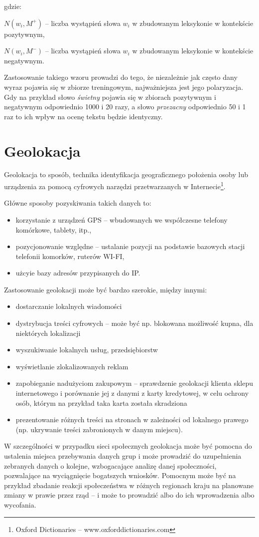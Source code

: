 gdzie:

$N(w_i, M^+)$ -- liczba wystąpień słowa $w_i$ w zbudowanym leksykonie w 
kontekście pozytywnym,

$N(w_i, M^-)$ -- liczba wystąpień słowa $w_i$ w zbudowanym leksykonie w 
kontekście negatywnym.

\bigskip
Zastosowanie takiego wzoru prowadzi do tego, że niezależnie jak często
dany wyraz pojawia się w zbiorze treningowym, najważniejsza jest jego polaryzacja.
Gdy na przykład słowo \textit{świetny} pojawia się w zbiorach pozytywnym
i negatywnym odpowiednio 1000 i 20 razy, a słowo \textit{przezacny} odpowiednio
50 i 1 raz to ich wpływ na ocenę tekstu będzie identyczny.




\clearpage\section{Geolokacja}
Geolokacja to sposób, technika identyfikacja geograficznego położenia osoby
lub urządzenia za pomocą cyfrowych narzędzi przetwarzanych w 
Internecie\footnote{Oxford Dictionaries -- www.oxforddictionaries.com}.

Główne sposoby pozyskiwania takich danych to:
\begin{itemize}
  \item korzystanie z urządzeń GPS -- wbudowanych we współczesne telefony
komórkowe, tablety, itp.,
  \item pozycjonowanie względne -- ustalanie pozycji na podstawie bazowych stacji
telefonii komorków, ruterów WI-FI,
\item użcyie bazy adresów przypisanych do IP.
\end{itemize} 
Zastosowanie geolokacji może być bardzo szerokie, między innymi:
\begin{itemize}
  \item dostarczanie lokalnych wiadomości
  \item dystrybucja treści cyfrowych -- może być np. blokowana możliwość kupna, 
  dla niektórych lokalizacji
  \item wyszukiwanie lokalnych usług, przedsiębiorstw
  \item wyświetlanie zlokalizowanych reklam
  \item zapobieganie nadużyciom zakupowym -- sprawdzenie geolokacji
  klienta sklepu internetowego i porównanie jej z danymi z karty kredytowej,
  w celu ochrony osób, którym na przykład taka karta została skradziona
  \item prezentowanie różnych treści na stronach w zależności od lokalnego
  prawego (np. ukrywanie treści zabronionych w danym miejscu).
\end{itemize}
W szczególności w przypadku sieci społecznych geolokacja może być pomocna do
ustalenia miejsca przebywania danych grup i może prowadzić
do uzupełnienia zebranych danych o kolejne, wzbogacające analizę danej społeczności,
pozwalające na wyciągnięcie bogatszych wniosków. Pomocnym może być na przykład
zbadanie reakcji społeczeństwa w różnych regionach kraju na planowane zmiany
w prawie przez rząd -- i może to prowadzić albo do ich wprowadzenia albo wycofania.

